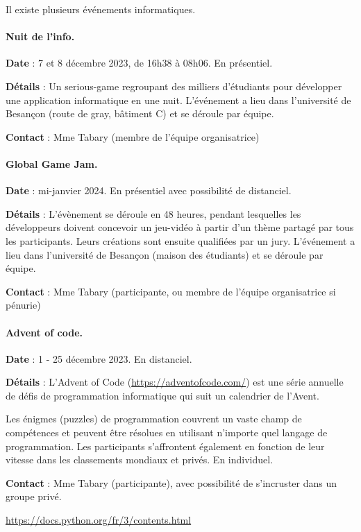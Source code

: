 \documentclass[10pt, a4paper]{article}
\begin{document}
\begin{tcolorbox}[lefttitle=2cm, colframe=gray!75!black, title= \textbf{Evénements}]
Il existe plusieurs événements informatiques.


\paragraph{Nuit de l'info.}

\textbf{Date} : 7 et 8 décembre 2023, de 16h38 à 08h06. En présentiel.

\textbf{Détails} : Un serious-game regroupant des milliers d’étudiants pour développer une application informatique en une nuit. L'événement a lieu dans l'université de Besançon (route de gray, bâtiment C) et se déroule par équipe.

\textbf{Contact} : Mme Tabary (membre de l'équipe organisatrice)



\paragraph{Global Game Jam.}

\textbf{Date} : mi-janvier 2024. En présentiel avec possibilité de distanciel.

\textbf{Détails} : L'évènement se déroule en 48 heures, pendant lesquelles les développeurs doivent concevoir un jeu-vidéo à partir d'un thème partagé par tous les participants. Leurs créations sont ensuite qualifiées par un jury. L'événement a lieu dans l'université de Besançon (maison des étudiants) et se déroule par équipe.

\textbf{Contact} : Mme Tabary  (participante, ou membre de l'équipe organisatrice si pénurie)


\paragraph{Advent of code.}

\textbf{Date} : 1 - 25 décembre 2023. En distanciel.

\textbf{Détails} : L'Advent of Code (\url{https://adventofcode.com/}) est une série annuelle de défis de programmation informatique qui suit un calendrier de l'Avent.

Les énigmes (puzzles) de programmation couvrent un vaste champ de compétences et peuvent être résolues en utilisant n'importe quel langage de programmation. Les participants s'affrontent également en fonction de leur vitesse dans les classements mondiaux et privés.  En individuel.

\textbf{Contact} :  Mme Tabary  (participante), avec possibilité de s'incruster dans un groupe privé.


\end{tcolorbox}
\begin{tcolorbox}[lefttitle=2cm, colframe=gray!75!black, title= \textbf{Le manuel}]
\url{https://docs.python.org/fr/3/contents.html}
\end{tcolorbox}
\end{document}
